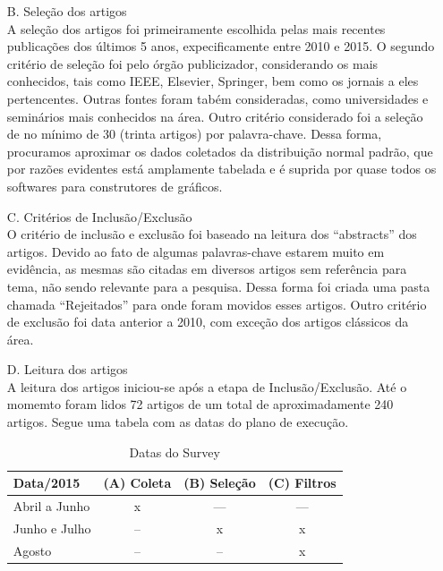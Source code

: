 \begin{enumerate}
 \item[B.] Seleção dos artigos\\
    A seleção dos artigos foi primeiramente escolhida pelas mais recentes publicações dos últimos 5 anos, expecificamente entre 2010 e 2015. 
    O segundo critério de seleção foi pelo órgão publicizador, considerando os mais conhecidos, tais como IEEE, Elsevier, Springer, bem como os jornais a eles pertencentes. 
    Outras fontes foram tabém consideradas, como universidades e seminários mais conhecidos na área.
    Outro critério considerado foi a seleção de no mínimo de 30 (trinta artigos) por palavra-chave.
    Dessa forma, procuramos aproximar os dados coletados da distribuição normal padrão, que por razões evidentes está amplamente
    tabelada e é suprida por quase todos os softwares para construtores de gráficos.\\

\pagebreak
    
 \item[C.] Critérios de Inclusão/Exclusão \\
    O critério de inclusão e exclusão foi baseado na leitura dos ``abstracts'' dos artigos. 
    Devido ao fato de algumas palavras-chave estarem muito em evidência, as mesmas são citadas em diversos artigos sem referência para tema,
    não sendo relevante para a pesquisa. Dessa forma foi criada uma pasta chamada ``Rejeitados'' para onde foram movidos esses artigos.
    Outro critério de exclusão foi data anterior a 2010, com exceção dos artigos clássicos da área.\\

 \item[D.] Leitura dos artigos \\
    A leitura dos artigos iniciou-se após a etapa de Inclusão/Exclusão.
    Até o momemto foram lidos 72 artigos de um total de aproximadamente 240 artigos.
    Segue uma tabela com as datas do plano de execução.
    
    \begin{table}[htbp]
      \scriptsize
      \centering
      \caption{Datas do Survey}
	\begin{tabular}{l|c|c|c}
	\hline
	\textbf{Data/2015} & \textbf{(A) Coleta} & (B) \textbf{Seleção} & \textbf{(C) Filtros} \\
	\hline
	Abril a Junho & x & --- & --- \\ \hline
	Junho e Julho & -- & x & x \\ \hline
	Agosto & -- & -- & x \\ \hline
	\end{tabular}
    \end{table}
  
 \end{enumerate}



